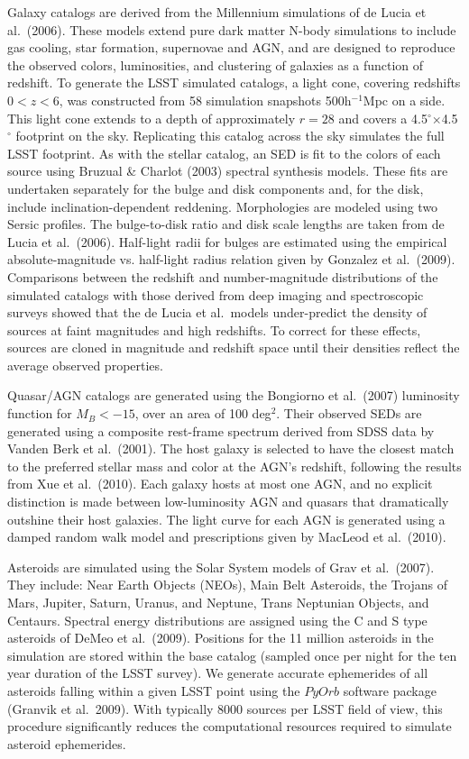 \documentclass{emulateapj}
\begin{document}
{Galaxy catalogs are derived from the Millennium simulations of de
Lucia et al.~(2006).  These models extend pure dark matter N-body
simulations to include gas cooling, star formation, supernovae and
AGN, and are designed to reproduce the observed colors, luminosities,
and clustering of galaxies as a function of redshift. To generate the
LSST simulated catalogs, a light cone, covering redshifts $0<z<6$, was
constructed from 58 simulation snapshots 500h$^{-1}$Mpc on a side. This
light cone extends to a depth of approximately $r=28$ and covers a
4.5$^\circ$$\times$4.5$^\circ$ footprint on the sky. Replicating this
catalog across the sky simulates the full LSST footprint. As with the
stellar catalog, an SED is fit to the colors of each source using
Bruzual \& Charlot (2003) spectral synthesis models. These fits are
undertaken separately for the bulge and disk components and, for the
disk, include inclination-dependent reddening. Morphologies are
modeled using two Sersic profiles. The bulge-to-disk ratio and disk
scale lengths are taken from de Lucia et al.~(2006). Half-light radii
for bulges are estimated using the empirical absolute-magnitude
vs. half-light radius relation given by Gonzalez et
al.~(2009). Comparisons between the redshift and number-magnitude
distributions of the simulated catalogs with those derived from deep
imaging and spectroscopic surveys showed that the de Lucia et
al.~models under-predict the density of sources at faint magnitudes
and high redshifts. To correct for these effects, sources are cloned
in magnitude and redshift space until their densities reflect the
average observed properties.

Quasar/AGN catalogs are generated using the Bongiorno et al.~(2007)
luminosity function for $M_B < -15$, over an area of 100
deg$^2$. Their observed SEDs are generated using a composite
rest-frame spectrum derived from SDSS data by Vanden Berk et
al.~(2001). The host galaxy is selected to have the closest match to
the preferred stellar mass and color at the AGN's redshift, following
the results from Xue et al.~(2010).  Each galaxy hosts at most one
AGN, and no explicit distinction is made between low-luminosity AGN and
quasars that dramatically outshine their host galaxies. The light
curve for each AGN is generated using a damped random walk model and
prescriptions given by MacLeod et al.~(2010).

Asteroids are simulated using the Solar System models of Grav et
al.~(2007). They include: Near Earth Objects (NEOs), Main Belt
Asteroids, the Trojans of Mars, Jupiter, Saturn, Uranus, and Neptune,
Trans Neptunian Objects, and Centaurs. Spectral energy distributions
are assigned using the C and S type asteroids of DeMeo et
al.~(2009). Positions for the 11 million asteroids in the simulation
are stored within the base catalog (sampled once per night for the ten
year duration of the LSST survey). We generate
accurate ephemerides of all asteroids falling within a given LSST
point using the $PyOrb$ software package (Granvik et
al.~2009). With typically 8000 sources per LSST field of view, this
procedure significantly reduces the computational resources
required to simulate asteroid ephemerides.



}
\end{document}
